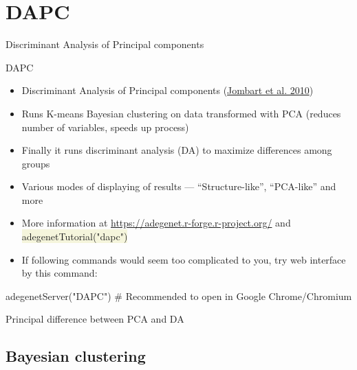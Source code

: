 \documentclass[compress, ucs, xelatex, 11pt, xcolor=svgnames, aspectratio=169,
	hyperref={
		bookmarks=true,
		unicode=true,
		colorlinks=true,
		pdftitle={Molecular data in R},
		plainpages=false,
		pdfauthor={Vojtech Zeisek},
		pdfsubject={Course about phylogeny and evolution in R},
		pdfcreator={XeLaTeX},
		pdfkeywords={R, evolution, phylogeny, molecular data},
		linkcolor=Crimson, %
		anchorcolor=Magenta, %
		citecolor=Magenta, %
		filecolor=Magenta, %
		menucolor=Magenta, %
		urlcolor=DodgerBlue, %
		pdftex},
	url={hyphens, lowtilde} %
	]{beamer}
\renewcommand{\texttt}[1]{\colorbox{Beige}{{\ttfamily #1}}}
\begin{document}
\section{DAPC}

\begin{frame}{Discriminant Analysis of Principal components}
	\tableofcontents[currentsection, sectionstyle=show/hide, hideothersubsections]
\end{frame}

\begin{frame}[fragile]{DAPC}
	\label{DAPC}
	\begin{itemize}
		\item Discriminant Analysis of Principal components (\href{https://bmcgenet.biomedcentral.com/articles/10.1186/1471-2156-11-94}{Jombart et al. 2010})
		\item Runs K-means Bayesian clustering on data transformed with PCA (reduces number of variables, speeds up process)
		\item Finally it runs discriminant analysis (DA) to maximize differences among groups
		\item Various modes of displaying of results --- \enquote{Structure-like}, \enquote{PCA-like} and more
		\item More information at \url{https://adegenet.r-forge.r-project.org/} and \texttt{adegenetTutorial("dapc")}
		\item If following commands would seem too complicated to you, try web interface by this command:
	\end{itemize}
	\begin{spluscode}
    adegenetServer("DAPC") # Recommended to open in Google Chrome/Chromium
	\end{spluscode}
\end{frame}

\begin{frame}{Principal difference between PCA and DA}
	\begin{center}
		\texttt{[image: dapc-da-pca.png]}
	\end{center}
\end{frame}

\subsection{Bayesian clustering}
\end{document}
